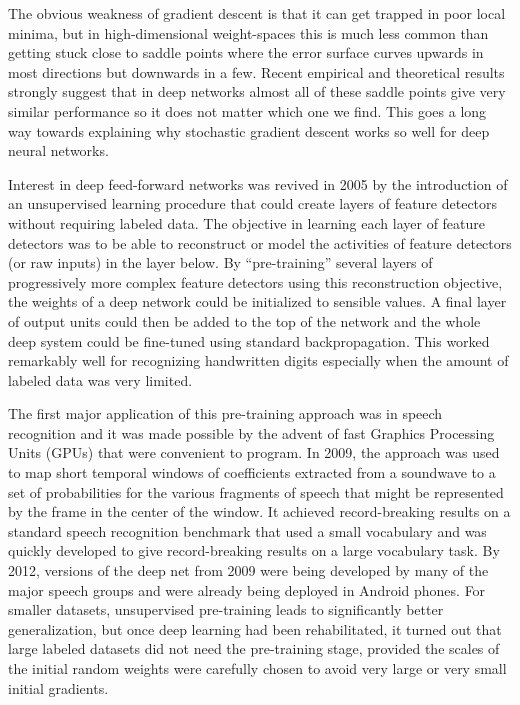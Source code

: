 \documentclass[]{article}
\begin{document}
The obvious weakness of gradient descent is that it can get trapped in poor local minima, but in high-dimensional
weight-spaces this is much less common than getting stuck close to saddle points where the error surface curves upwards
in most directions but downwards in a few. Recent empirical\cite{Bengio} and theoretical results\cite{Yann} strongly
suggest that in deep networks almost all of these saddle points give very similar performance so it does not matter
which one we find.  This goes a long way towards explaining why stochastic gradient descent works so well for deep
neural networks.

Interest in deep feed-forward networks was revived in 2005\cite{IJCAI} by the introduction of an unsupervised learning
procedure that could create layers of feature detectors without requiring labeled data. The objective in learning each
layer of feature detectors was to be able to reconstruct or model the activities of feature detectors (or raw inputs) in the
layer below.  By ``pre-training''  several layers of progressively more complex feature detectors using this reconstruction
objective, the weights of a deep network could be initialized to sensible values.  A final layer of output units could
then be added to the top of the network and the whole deep system could be fine-tuned using standard
backpropagation\cite{Science}. This worked remarkably well for recognizing handwritten digits especially when the amount
of labeled data was very limited\cite{BengioNips06}.  

The first major application of this pre-training approach was in speech recognition and it was made possible by the
advent of fast Graphics Processing Units (GPUs) that were convenient to program.  In 2009, the approach was used to map
short temporal windows of coefficients extracted from a soundwave to a set of probabilities for the various fragments of
speech that might be represented by the frame in the center of the window.  It achieved record-breaking results on a
standard speech recognition benchmark that used a small vocabulary\cite{TIMITpaper} and was quickly developed to give
record-breaking results on a large vocabulary task\cite{Dahl}.  By 2012, versions of the deep net from 2009 were being
developed by many of the major speech groups\cite{SPS} and were already being deployed in Android phones.  For smaller
datasets, unsupervised pre-training leads to significantly better generalization, but once deep
learning had been rehabilitated, it turned out that large labeled datasets did not need the pre-training stage, provided the
scales of the initial random weights were carefully chosen to avoid very large or very small initial gradients.
\end{document}
